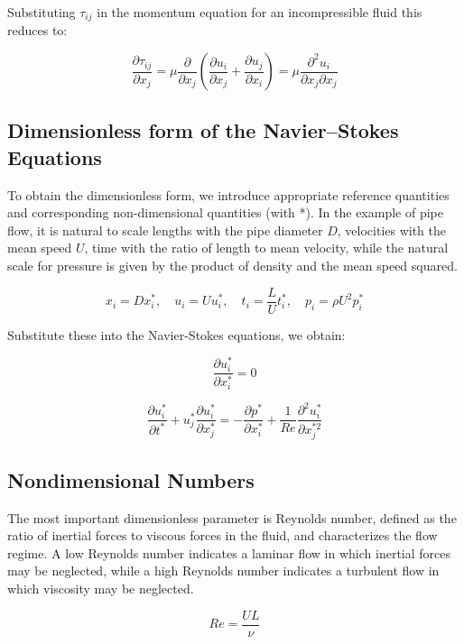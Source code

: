 \documentclass{article}
\begin{document}
Substituting $\tau_{ij}$ in the momentum equation for an incompressible fluid this reduces to:

\begin{equation}
\frac{\partial \tau_{ij}}{\partial x_j} = \mu \frac{\partial}{\partial x_j} \left( \frac{\partial u_i}{\partial x_j} + \frac{\partial u_j}{\partial x_i} \right) = \mu \frac{\partial^2 u_i}{\partial x_j \partial x_j}
\end{equation}

\subsection{Dimensionless form of the Navier–Stokes Equations}
To obtain the dimensionless form, we introduce appropriate reference quantities and corresponding non-dimensional quantities (with *). In the example of pipe flow, it is natural to scale lengths with the pipe diameter $D$, velocities with the mean speed $U$, time with the ratio of length to mean velocity, while the natural scale for pressure is given by the product of density and the mean speed squared.

\[
x_i = D x_i^*, \quad u_i = U u_i^*, \quad t_i = \frac{L}{U} t_i^*, \quad p_i = \rho U^2 p_i^*
\]

Substitute these into the Navier-Stokes equations, we obtain:

\begin{equation}
\frac{\partial u_i^*}{\partial x_i^*} = 0
\end{equation}

\begin{equation}
\frac{\partial u_i^*}{\partial t^*} + u_j^* \frac{\partial u_i^*}{\partial x_j^*} = - \frac{\partial p^*}{\partial x_i^*} + \frac{1}{Re} \frac{\partial^2 u_i^*}{\partial x_j^{*2}} \label{N-S}
\end{equation}

\subsection{Nondimensional Numbers}
The most important dimensionless parameter is Reynolds number, defined as the ratio of inertial forces to viscous forces in the fluid, and characterizes the flow regime. A low Reynolds number indicates a laminar flow in which inertial forces may be neglected, while a high Reynolds number indicates a turbulent flow in which viscosity may be neglected.

\[
Re = \frac{UL}{\nu}
\]
\end{document}
